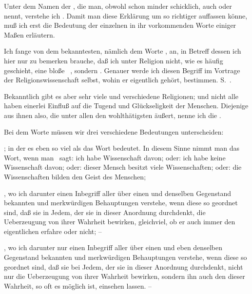Unter dem Namen der , die man, obwohl schon minder schicklich, auch  oder  nennt, verstehe ich . Damit man diese Erklärung um so richtiger auffassen könne, muß ich erst die Bedeutung der einzelnen in ihr vorkommenden Worte einiger Maßen erläutern.
\begin{aufza}
\item Ich fange von dem bekanntesten, nämlich dem Worte , an, in Betreff dessen ich hier nur zu bemerken brauche, daß ich unter Religion nicht, wie es häufig geschieht, eine bloße~ , sondern . Genauer werde ich diesen Begriff im Vortrage der Religionswissenschaft selbst, wohin er eigentlich gehört, bestimmen. S.~. 
\item Bekanntlich gibt es aber sehr viele und verschiedene Religionen; und nicht alle haben einerlei Einfluß auf die Tugend und Glückseligkeit der Menschen. Diejenige aus ihnen also, die unter allen den wohlthätigsten äußert, nenne ich die .
\item Bei dem Worte  müssen wir drei verschiedene Bedeutungen unterscheiden:
\begin{aufzb}
\item {}; in der es eben so viel als das Wort  bedeutet. In diesem Sinne nimmt man das Wort, wenn man \zB\ sagt: ich habe Wissenschaft davon; oder: ich habe keine Wissenschaft davon; oder: dieser Mensch besitzt viele Wissenschaften; oder: die Wissenschaften bilden den Geist des Menschen; \usw\
\item {}, wo ich darunter einen Inbegriff aller über einen und denselben Gegenstand bekannten und merkwürdigen Behauptungen verstehe, wenn diese so geordnet sind, daß sie in Jedem, der sie in dieser Anordnung durchdenkt, die Ueberzeugung von ihrer Wahrheit bewirken, gleichviel, ob er auch immer den eigentlichen  erfahre oder nicht; --
\item \RWbet{endlich die objective engere Bedeutung}, wo ich darunter nur einen Inbegriff aller über einen und eben denselben Gegenstand bekannten und merkwürdigen Behauptungen verstehe, wenn diese so geordnet sind, daß sie bei Jedem, der sie in dieser Anordnung durchdenkt, nicht nur die Ueberzeugung von ihrer Wahrheit bewirken, sondern ihn auch den \RWbet{Grund} dieser Wahrheit, so oft es möglich ist, einsehen lassen. -- 

\end{aufzb}
\end{aufza}
